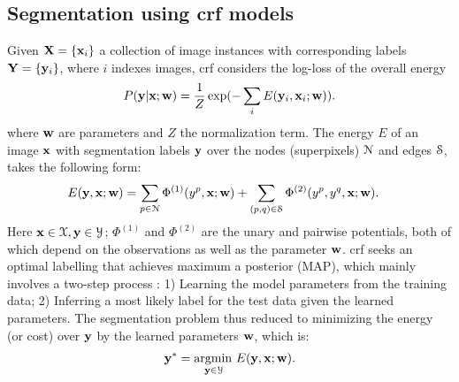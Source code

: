 \documentclass[10pt,3p]{elsarticle}
\def\argmin{\operatorname*{argmin\,}}
\newcommand{\crf}{{\sc crf}\xspace}
\def\bw{{\bf w}}
\def\bx{{\bf x}}
\def\by{{\bf y}}
\def\bh{{ \Phi }}
\let\x\bx
\let\y\by
\let\w\bw
\def\X{ {\bf X } }
\def\Y{ {\bf Y } }
\begin{document}
\subsection{Segmentation using \crf models}

%
%
Given $\X=\{\x_i\}$ a collection of image instances with corresponding labels $\Y=\{\y_i\}$, where $i$ indexes images,
\crf \cite{Lafferty01Conditional} considers the log-loss of the overall energy
\begin{align}  \label{eq:crf_log}
P(\y|\x; \w) = \frac{1}{Z} \exp (-\sum_i E(\y_i, \x_i;\w)).
\end{align}
where  $\w$ are parameters and $Z$ the normalization term.
%
The energy $E$ of an image $\x$ with segmentation labels $\y$ over the nodes (superpixels) $\cal N$ and edges $\cal S$, takes the following form:
\begin{align}
\label{eq:seg_energy}
	E(\y, \x; \w)& =\sum_{p \in {\cal N} } \bh^{(1)}(y^{p}, \x;\w)
	 + \sum_{(p,q) \in {\cal S}} \bh^{(2)}(y^{p}, y^{q}, \x; \w).
\end{align}
Here $ \bx \in {\cal X}, \by \in {\cal Y}$;
%
$\bh^{(1)}$ and $\bh^{(2)}$ are the unary and pairwise potentials, both of which depend on the observations as well as the parameter $ \w $.
\crf seeks an optimal labelling that achieves maximum a posterior (MAP), which mainly involves a two-step process \cite{SzummerKH08}: 1) Learning the model parameters from the training data; 2) Inferring a most likely label for the test data given the learned parameters.
The segmentation problem thus reduced to minimizing the energy (or cost) over $\y$ by the learned parameters $ \w $, which is:
\begin{align}
\y^{*}=\argmin_{ \y \in  {\cal Y}} E(\y, \x; \w).
\end{align}
%
\end{document}
